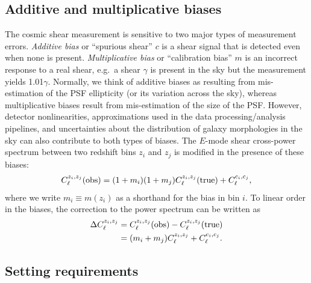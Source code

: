 \documentclass[usenatbib]{mnras}
\begin{document}
\subsection{Additive and multiplicative biases}
\label{ss:add_mult}

The cosmic shear measurement is sensitive to two major types of
measurement errors. {\em Additive bias} or ``spurious shear'' $c$ is a
shear signal that is detected even when none is present. {\em
Multiplicative bias} or ``calibration bias'' $m$ is an incorrect response
to a real shear, e.g.\ a shear $\gamma$ is present in the sky but the
measurement yields 1.01$\gamma$. Normally, we think of additive biases
as resulting from mis-estimation of the PSF ellipticity (or its
variation across the sky), whereas multiplicative biases result from
mis-estimation of the size of the PSF. However, detector
nonlinearities, approximations used in the data processing/analysis
pipelines, and uncertainties about the distribution of galaxy
morphologies in the sky can also contribute to both types of
biases.  The $E$-mode
shear cross-power spectrum between two redshift bins $z_i$ and $z_j$
is modified in the presence of these biases:
\begin{equation}
C_\ell^{z_i,z_j}({\rm obs}) = (1+m_i)(1+m_j)C_\ell^{z_i,z_j}({\rm true}) + C_\ell^{c_i,c_j},
\label{eq:mod}
\end{equation}
where we write $m_i\equiv m(z_i)$ as a shorthand for the bias in bin $i$. To linear order in
the biases, the correction to the power spectrum can be written as
\begin{align}
\Delta C_\ell^{z_i,z_j} &= C_\ell^{z_i,z_j}({\rm obs}) - C_\ell^{z_i,z_j}({\rm true}) \nonumber\\
&= (m_i+m_j)C_\ell^{z_i,z_j}+C_\ell^{c_i,c_j}.
\label{eq:Delta C}
\end{align}

\subsection{Setting requirements}
\end{document}
